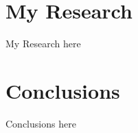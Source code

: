 \documentclass{beamer}
\begin{document}


\section{My Research}

\begin{frame}
  My Research here
\end{frame}

\section{Conclusions}

\begin{frame}
  Conclusions here 
\end{frame}
\end{document}
